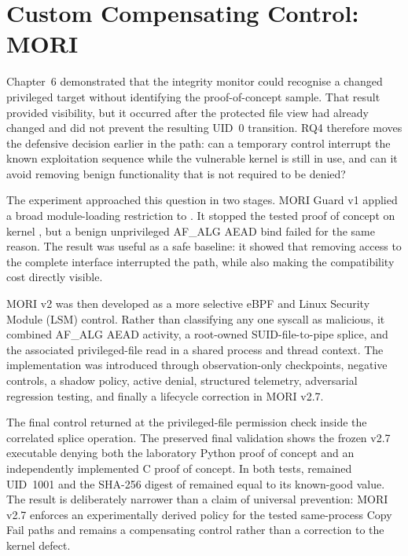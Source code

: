 \section{Custom Compensating Control: MORI}
\label{sec:compensating-control}

\graphicspath{{../evidence/}{evidence/}}

Chapter~6 demonstrated that the integrity monitor could recognise a changed
privileged target without identifying the proof-of-concept sample. That result
provided visibility, but it occurred after the protected file view had already
changed and did not prevent the resulting UID~0 transition. RQ4 therefore moves
the defensive decision earlier in the path: can a temporary control interrupt
the known exploitation sequence while the vulnerable kernel is still in use,
and can it avoid removing benign functionality that is not required to be
denied?

The experiment approached this question in two stages. MORI Guard v1 applied a
broad module-loading restriction to . It stopped the tested
proof of concept on kernel , but a benign unprivileged
AF\_ALG AEAD bind failed for the same reason. The result was useful as a safe
baseline: it showed that removing access to the complete interface interrupted
the path, while also making the compatibility cost directly visible.

MORI v2 was then developed as a more selective eBPF and Linux Security Module
(LSM) control. Rather than classifying any one syscall as malicious, it combined
AF\_ALG AEAD activity, a root-owned SUID-file-to-pipe splice, and the associated
privileged-file read in a shared process and thread context. The implementation
was introduced through observation-only checkpoints, negative controls, a
shadow policy, active denial, structured telemetry, adversarial regression
testing, and finally a lifecycle correction in MORI v2.7.

The final control returned  at the privileged-file permission check
inside the correlated splice operation. The preserved final validation shows
the frozen v2.7 executable denying both the laboratory Python proof of concept
and an independently implemented C proof of concept. In both tests,
 remained UID~1001 and the SHA-256 digest of 
remained equal to its known-good value. The result is deliberately narrower
than a claim of universal prevention: MORI v2.7 enforces an experimentally
derived policy for the tested same-process Copy Fail paths and remains a
compensating control rather than a correction to the kernel defect.

